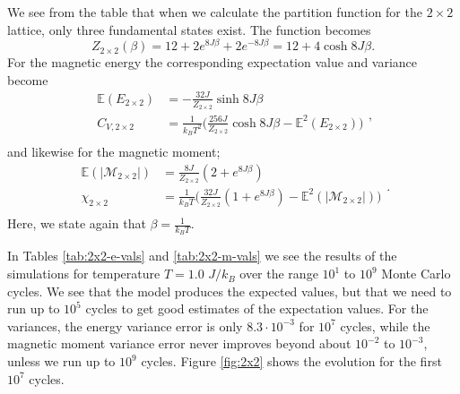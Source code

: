 \documentclass[]{article}
\begin{document}
We see from the table that when we calculate the partition function for the $2 \times 2$ lattice, only three fundamental states exist. The function becomes
\begin{equation}
	Z_{2 \times 2} (\beta) = 12 + 2e^{8J \beta} + 2e^{-8J \beta} = 12 + 4\cosh 8J\beta.
\end{equation}
For the magnetic energy the corresponding expectation value and variance become
\begin{equation} \label{eq:energy-analytical}
\begin{aligned}
	\mathbb{E}(E_{2 \times 2}) &= -\frac{32J}{Z_{2 \times 2}} \sinh 8J\beta \\
	C_{V, 2 \times 2} &= \frac{1}{k_B T^2} \bigg( \frac{256J}{Z_{2 \times 2}} \cosh 8J\beta - \mathbb{E}^2(E_{2 \times 2}) \bigg) \\
\end{aligned},
\end{equation} \label{eq:moment-analytical}
and likewise for the magnetic moment; 
\begin{equation}
\begin{aligned}
	\mathbb{E}(|\mathcal{M}_{2 \times 2}|) &= \frac{8J}{Z_{2 \times 2}} (2 + e^{8J\beta}) \\
	\chi_{2 \times 2} &= \frac{1}{k_B T} \bigg( \frac{32J}{Z_{2 \times 2}} (1 + e^{8J\beta}) - \mathbb{E}^2(|\mathcal{M}_{2 \times 2}|) \bigg) \\
\end{aligned}.
\end{equation}
Here, we state again that $\beta = \frac{1}{k_B T}$.

In Tables \ref{tab:2x2-e-vals} and \ref{tab:2x2-m-vals} we see the results of the simulations for temperature $T=1.0$ $J/k_B$ over the range $10^1$ to $10^9$ Monte Carlo cycles. We see that the model produces the expected values, but that we need to run up to $10^5$ cycles to get good estimates of the expectation values. For the variances, the energy variance error is only $8.3 \cdot 10^{-3}$ for $10^7$ cycles, while the magnetic moment variance error never improves beyond about $10^{-2}$ to $10^{-3}$, unless we run up to $10^9$ cycles. Figure \ref{fig:2x2} shows the evolution for the first $10^7$ cycles.
\end{document}
